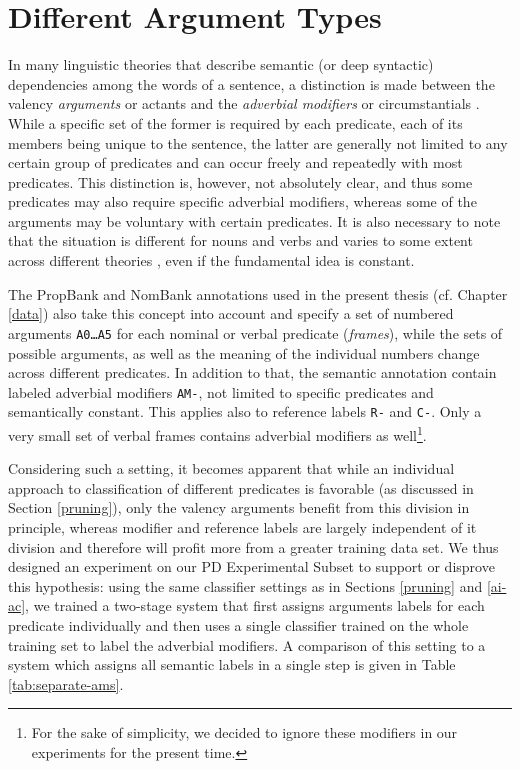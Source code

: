 \documentclass[12pt,notitlepage]{report}
\begin{document}
\section{Different Argument Types}\label{arg-types}

In many linguistic theories that describe semantic (or deep syntactic) dependencies among the words of a sentence, a distinction is made between the valency \emph{arguments} or actants and the \emph{adverbial modifiers} or circumstantials \citep[p. 100ff.]{sgal86}. While a specific set of the former is required by each predicate, each of its members being unique to the sentence, the latter are generally not limited to any certain group of predicates and can occur freely and repeatedly with most predicates. This distinction is, however, not absolutely clear, and thus some predicates may also require specific adverbial modifiers, whereas some of the arguments may be voluntary with certain predicates. It is also necessary to note that the situation is different for nouns and verbs and varies to some extent across different theories \citep{rambow03}, even if the fundamental idea is constant.

The PropBank \citep{kinsbury02,palmer05} and NomBank \citep{meyers04} annotations used in the present thesis (cf. Chapter \ref{data}) also take this concept into account and specify a set of numbered arguments \texttt{A0\dots A5} for each nominal or verbal predicate (\emph{frames}), while the sets of possible arguments, as well as the meaning of the individual numbers change across different predicates. In addition to that, the semantic annotation contain labeled adverbial modifiers \texttt{AM-}, not limited to specific predicates and semantically constant. This applies also to reference labels \texttt{R-} and \texttt{C-}. Only a very small set of verbal frames contains adverbial modifiers as well\footnote{For the sake of simplicity, we decided to ignore these modifiers in our experiments for the present time.}.

Considering such a setting, it becomes apparent that while an individual approach to classification of different predicates is favorable (as discussed in Section \ref{pruning}), only the valency arguments benefit from this division in principle, whereas modifier and reference labels are largely independent of it division and therefore will profit more from a greater training data set. We thus designed an experiment on our PD Experimental Subset to support or disprove this hypothesis: using the same classifier settings as in Sections \ref{pruning} and \ref{ai-ac}, we trained a two-stage system that first assigns arguments labels for each predicate individually and then uses a single classifier trained on the whole training set to label the adverbial modifiers. A comparison of this setting to a system which assigns all semantic labels in a single step is given in Table \ref{tab:separate-ams}.
\end{document}
